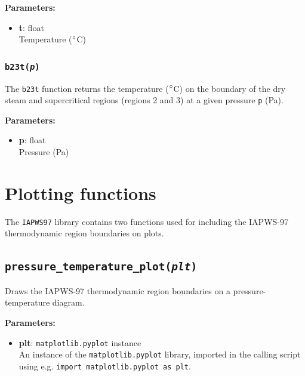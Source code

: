 \textbf{Parameters:}
\begin{itemize}
\item \textbf{t}: float\\
  Temperature ($\degree$C)
\end{itemize}

\begin{snugshade}
\subsubsection{\texttt{b23t(\emph{p})}}
\end{snugshade}
\label{sec:iapws97:b23t}

The \texttt{b23t} function returns the temperature ($\degree$C) on the boundary of the dry steam and supercritical regions (regions 2 and 3) at a given pressure \texttt{p} (Pa).

\textbf{Parameters:}
\begin{itemize}
\item \textbf{p}: float\\
  Pressure (Pa)
\end{itemize}

\section{Plotting functions}

The \texttt{IAPWS97} library contains two functions used for including the IAPWS-97 thermodynamic region boundaries on plots.

\begin{snugshade}
\subsection{\texttt{pressure\_temperature\_plot(\emph{plt})}}
\end{snugshade}
\label{sec:iapws97:pressure_temperature_plot}

Draws the IAPWS-97 thermodynamic region boundaries on a pressure-temperature diagram.

\textbf{Parameters:}
\begin{itemize}
\item \textbf{plt}: \texttt{matplotlib.pyplot} instance\\
  An instance of the \texttt{matplotlib.pyplot} library, imported in the calling script using e.g. \texttt{import matplotlib.pyplot as plt}.
\end{itemize}

